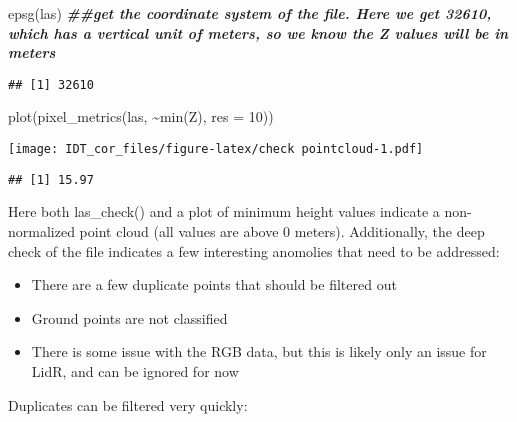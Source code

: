 \documentclass[
]{article}
\newenvironment{Shaded}{\begin{snugshade}}{\end{snugshade}}
\newcommand{\AttributeTok}[1]{\textcolor[rgb]{0.77,0.63,0.00}{#1}}
\newcommand{\DecValTok}[1]{\textcolor[rgb]{0.00,0.00,0.81}{#1}}
\newcommand{\DocumentationTok}[1]{\textcolor[rgb]{0.56,0.35,0.01}{\textbf{\textit{#1}}}}
\newcommand{\FunctionTok}[1]{\textcolor[rgb]{0.00,0.00,0.00}{#1}}
\newcommand{\NormalTok}[1]{#1}
\newcommand{\SpecialCharTok}[1]{\textcolor[rgb]{0.00,0.00,0.00}{#1}}
\providecommand{\tightlist}{%
  \setlength{\itemsep}{0pt}\setlength{\parskip}{0pt}}
\begin{document}
\begin{Shaded}
\begin{Highlighting}[]
\FunctionTok{epsg}\NormalTok{(las) }\DocumentationTok{\#\#get the coordinate system of the file.  Here we get 32610, which has a vertical unit of meters, so we know the Z values will be in meters}
\end{Highlighting}
\end{Shaded}

\begin{verbatim}
## [1] 32610
\end{verbatim}

\begin{Shaded}
\begin{Highlighting}[]
\FunctionTok{plot}\NormalTok{(}\FunctionTok{pixel\_metrics}\NormalTok{(las, }\SpecialCharTok{\textasciitilde{}}\FunctionTok{min}\NormalTok{(Z), }\AttributeTok{res =} \DecValTok{10}\NormalTok{))}
\end{Highlighting}
\end{Shaded}

\texttt{[image: IDT\_cor\_files/figure-latex/check pointcloud-1.pdf]}

\begin{Shaded}
\end{Shaded}

\begin{verbatim}
## [1] 15.97
\end{verbatim}

Here both las\_check() and a plot of minimum height values indicate a
non-normalized point cloud (all values are above 0 meters).
Additionally, the deep check of the file indicates a few interesting
anomolies that need to be addressed:

\begin{itemize}
\tightlist
\item
  There are a few duplicate points that should be filtered out
\item
  Ground points are not classified
\item
  There is some issue with the RGB data, but this is likely only an
  issue for LidR, and can be ignored for now
\end{itemize}

Duplicates can be filtered very quickly:
\end{document}
